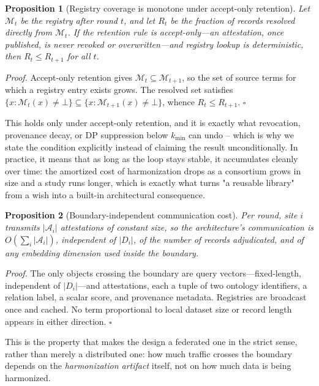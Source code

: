 \documentclass[conference]{IEEEtran}
\newcommand{\reg}{\mathcal{M}}
\newcommand{\att}{\mathcal{A}}
\newtheorem{proposition}{Proposition}
\begin{document}
\begin{proposition}[Registry coverage is monotone under accept-only retention]
\label{prop:registry}
Let $\reg_t$ be the registry after round $t$, and let $R_t$ be the fraction of records resolved directly from $\reg_t$. If the retention rule is accept-only---an attestation, once published, is never revoked or overwritten---and registry lookup is deterministic, then $R_t \le R_{t+1}$ for all $t$.
\end{proposition}

\noindent\textit{Proof.} Accept-only retention gives $\reg_t \subseteq \reg_{t+1}$, so the set of source terms for which a registry entry exists grows. The resolved set satisfies $\{x : \reg_t(x) \neq \bot\} \subseteq \{x : \reg_{t+1}(x) \neq \bot\}$, whence $R_t \le R_{t+1}$. \hfill$\square$

This holds only under accept-only retention, and it is exactly what revocation, provenance decay, or DP suppression below $k_{\min}$ can undo -- which is why we state the condition explicitly instead of claiming the result unconditionally. In practice, it means that as long as the loop stays stable, it accumulates cleanly over time: the amortized cost of harmonization drops as a consortium grows in size and a study runs longer, which is exactly what turns "a reusable library" from a wish into a built-in architectural consequence.

\begin{proposition}[Boundary-independent communication cost]
\label{prop:comm}
Per round, site $i$ transmits $|\att_i|$ attestations of constant size, so the architecture's communication is $O\!\left(\sum_i |\att_i|\right)$, independent of $|D_i|$, of the number of records adjudicated, and of any embedding dimension used inside the boundary.
\end{proposition}

\noindent\textit{Proof.} The only objects crossing the boundary are query vectors---fixed-length, independent of $|D_i|$---and attestations, each a tuple of two ontology identifiers, a relation label, a scalar score, and provenance metadata. Registries are broadcast once and cached. No term proportional to local dataset size or record length appears in either direction. \hfill$\square$

This is the property that makes the design a federated one in the strict sense, rather than merely a distributed one: how much traffic crosses the boundary depends on the \emph{harmonization artifact} itself, not on how much data is being harmonized.
\end{document}
